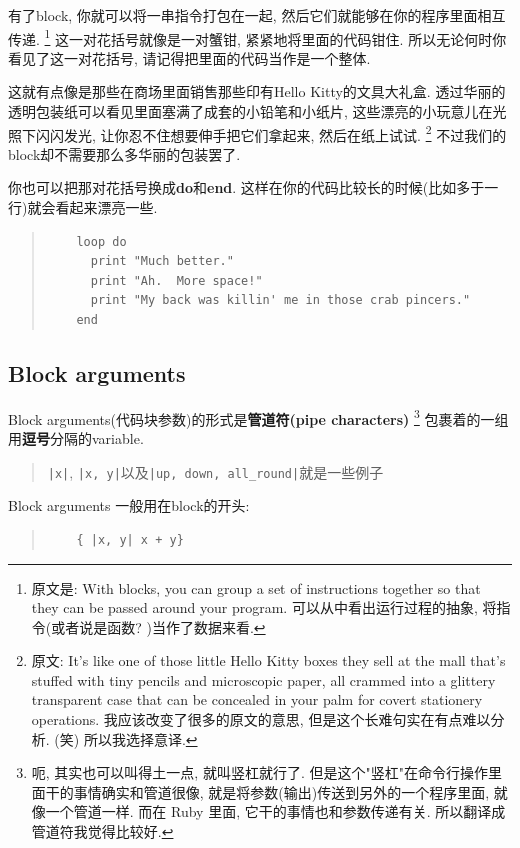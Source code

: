 有了block, 你就可以将一串指令打包在一起, 
然后它们就能够在你的程序里面相互传递. 
\footnote{原文是: With blocks, you can group a set of instructions together so that they can be passed around your program. 可以从中看出运行过程的抽象, 将指令(或者说是函数? )当作了数据来看. }
这一对花括号就像是一对蟹钳, 紧紧地将里面的代码钳住. 
所以无论何时你看见了这一对花括号, 请记得把里面的代码当作是一个整体. 

这就有点像是那些在商场里面销售那些印有Hello Kitty的文具大礼盒. 
透过华丽的透明包装纸可以看见里面塞满了成套的小铅笔和小纸片, 
这些漂亮的小玩意儿在光照下闪闪发光, 让你忍不住想要伸手把它们拿起来, 
然后在纸上试试. 
\footnote{原文: It's like one of those little Hello Kitty boxes they sell at the mall that's stuffed with tiny pencils and microscopic paper, all crammed into a glittery transparent case that can be concealed in your palm for covert stationery operations. 我应该改变了很多的原文的意思, 但是这个长难句实在有点难以分析. (笑) 所以我选择意译.}
不过我们的block却不需要那么多华丽的包装罢了. 

你也可以把那对花括号换成\textbf{do}和\textbf{end}. 
这样在你的代码比较长的时候(比如多于一行)就会看起来漂亮一些. 

\begin{quotation}
  \begin{verbatim}
    loop do
      print "Much better."
      print "Ah.  More space!"
      print "My back was killin' me in those crab pincers."
    end
  \end{verbatim}
\end{quotation}

\subsection*{Block arguments}
Block arguments(代码块参数)的形式是\textbf{管道符(pipe characters)}
\footnote{呃, 其实也可以叫得土一点, 就叫竖杠就行了. 但是这个"竖杠"在命令行操作里面干的事情确实和管道很像, 就是将参数(输出)传送到另外的一个程序里面, 就像一个管道一样. 而在 Ruby 里面, 它干的事情也和参数传递有关. 所以翻译成管道符我觉得比较好. }
包裹着的一组用\textbf{逗号}分隔的variable. 

\begin{quotation}
  \texttt{|x|}, \texttt{|x, y|}以及\texttt{|up, down, all_round|}就是一些例子
\end{quotation}

Block arguments 一般用在block的开头: 

\begin{quotation}
  \begin{verbatim}
    { |x, y| x + y}
  \end{verbatim}
\end{quotation}

